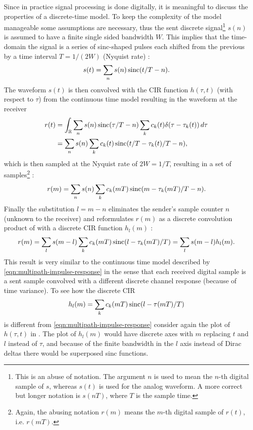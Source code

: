 Since in practice signal processing is done digitally, it is meaningful to discuss the properties of a discrete-time model. To keep the complexity of the model manageable some assumptions are necessary, thus the sent discrete signal\footnote{This is an abuse of notation. The argument \(n\) is used to mean the \(n\)-th digital sample of \(s\), whereas \(s(t)\) is used for the analog waveform. A more correct but longer notation is \(s(nT)\), where \(T\) is the sample time.} \(s(n)\) is assumed to have a finite single sided bandwidth \(W\). This implies that the time-domain the signal is a series of sinc-shaped pulses each shifted from the previous by a time interval \(T = 1 / (2W)\) (Nyquist rate) \cite{Messier}:
\begin{equation}
	s(t) = \sum_n s(n) \operatorname{sinc}(t/T - n).
\end{equation}
The waveform \(s(t)\) is then convolved with the CIR function \(h(\tau, t)\) (with respect to \(\tau\)) from the continuous time model resulting in the waveform at the receiver
\begin{align*}
	r(t) &= \int_ \mathbb{R} \sum_n s(n) \operatorname{sinc}(\tau / T - n) \sum_k c_k(t) \delta(\tau - \tau_k(t)) \,d\tau \\
	&= \sum_n s(n) \sum_k c_k(t) \operatorname{sinc}(t/T - \tau_k(t)/T - n),
\end{align*}
which is then sampled at the Nyquist rate of \(2W = 1/T\), resulting in a set of samples\footnote{Again, the abusing notation \(r(m)\) means the \(m\)-th digital sample of \(r(t)\), i.e. \(r(mT)\).} \cite{Messier}:
\[
	r(m) = \sum_n s(n) \sum_k c_k(mT) \operatorname{sinc}(m - \tau_k(mT)/T - n).
\]
Finally the substitution \(l = m - n\) eliminates the sender's sample counter \(n\) (unknown to the receiver) and reformulates \(r(m)\) as a discrete convolution product of with a discrete CIR function \(h_l(m)\) \cite{Messier}:
\begin{equation}
	r(m) = \sum_l s(m - l) \sum_k c_k(mT) \operatorname{sinc}(l - \tau_k(mT)/T) 
	= \sum_l s(m - l) h_l (m).
\end{equation}
This result is very similar to the continuous time model described by \eqref{eqn:multipath-impulse-response} in the sense that each received digital sample is a sent sample convolved with a different discrete channel response (because of time variance). To see how the discrete CIR
\begin{equation} \label{eqn:discrete-multipath-impulse-response}
	h_l(m) = \sum_k c_k(mT) \operatorname{sinc}(l - \tau(mT)/T)
\end{equation}
is different from \eqref{eqn:multipath-impulse-response} consider again the plot of \(h(\tau,t)\) in . The plot of \(h_l(m)\) would have discrete axes with \(m\) replacing \(t\) and \(l\) instead of \(\tau\), and because of the finite bandwidth in the \(l\) axis instead of Dirac deltas there would be superposed sinc functions.


